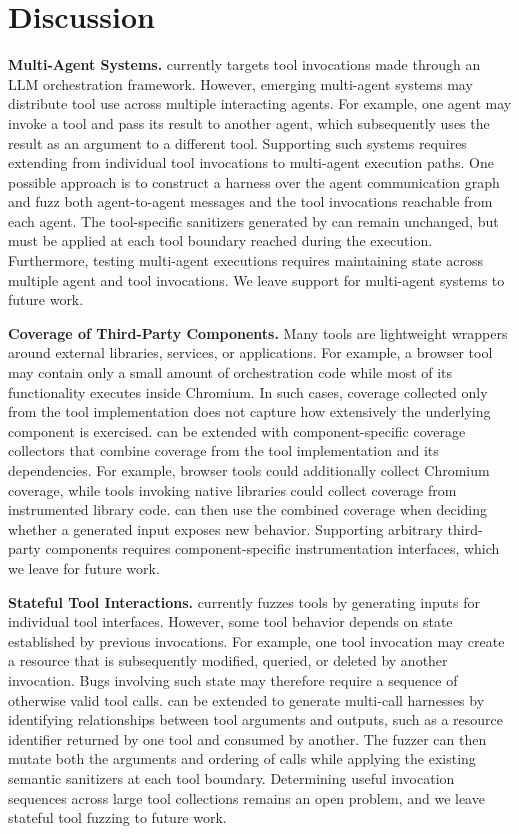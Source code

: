 \section{Discussion}
\label{sec:discussion}
\noindent\textbf{Multi-Agent Systems.}
\project{} currently targets tool invocations made through an LLM orchestration framework. However, emerging multi-agent systems may distribute tool use across multiple interacting agents. For example, one agent may invoke a tool and pass its result to another agent, which subsequently uses the result as an argument to a different tool. Supporting such systems requires extending \project{} from individual tool invocations to multi-agent execution paths. One possible approach is to construct a harness over the agent communication graph and fuzz both agent-to-agent messages and the tool invocations reachable from each agent. The tool-specific sanitizers generated by \project{} can remain unchanged, but must be applied at each tool boundary reached during the execution. Furthermore, testing multi-agent executions requires maintaining state across multiple agent and tool invocations. We leave support for multi-agent systems to future work.

\noindent\textbf{Coverage of Third-Party Components.}
Many tools are lightweight wrappers around external libraries, services, or applications. For example, a browser tool may contain only a small amount of orchestration code while most of its functionality executes inside Chromium. In such cases, coverage collected only from the tool implementation does not capture how extensively the underlying component is exercised. \project{} can be extended with component-specific coverage collectors that combine coverage from the tool implementation and its dependencies. For example, browser tools could additionally collect Chromium coverage, while tools invoking native libraries could collect coverage from instrumented library code. \project{} can then use the combined coverage when deciding whether a generated input exposes new behavior. Supporting arbitrary third-party components requires component-specific instrumentation interfaces, which we leave for future work.

\noindent\textbf{Stateful Tool Interactions.}
\project{} currently fuzzes tools by generating inputs for individual tool interfaces. However, some tool behavior depends on state established by previous invocations. For example, one tool invocation may create a resource that is subsequently modified, queried, or deleted by another invocation. Bugs involving such state may therefore require a sequence of otherwise valid tool calls. \project{} can be extended to generate multi-call harnesses by identifying relationships between tool arguments and outputs, such as a resource identifier returned by one tool and consumed by another. The fuzzer can then mutate both the arguments and ordering of calls while applying the existing semantic sanitizers at each tool boundary. Determining useful invocation sequences across large tool collections remains an open problem, and we leave stateful tool fuzzing to future work.

